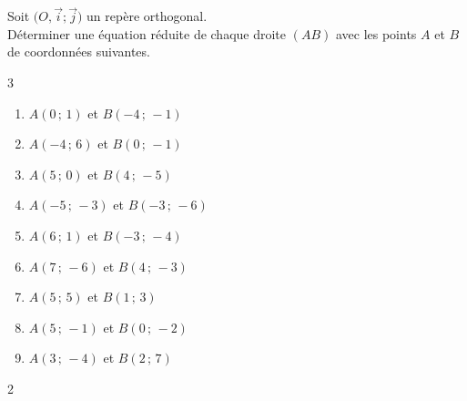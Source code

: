 {%
\begin{Exercice}
Soit $\big(O,\vec i;\vec j\big)$ un repère orthogonal.\\Déterminer une équation réduite de chaque droite $(AB)$ avec les points $A$ et $B$ de coordonnées suivantes.
\begin{multicols}{3}
\begin{enumerate}[itemsep=1em]
	\item \begin{minipage}[t]{\linewidth} $A(0\,;\,1)$ et $B(-4\,;\,-1)$ \end{minipage}
	\item \begin{minipage}[t]{\linewidth} $A(-4\,;\,6)$ et $B(0\,;\,-1)$ \end{minipage}
	\item \begin{minipage}[t]{\linewidth} $A(5\,;\,0)$ et $B(4\,;\,-5)$ \end{minipage}
	\item \begin{minipage}[t]{\linewidth} $A(-5\,;\,-3)$ et $B(-3\,;\,-6)$ \end{minipage}
	\item \begin{minipage}[t]{\linewidth} $A(6\,;\,1)$ et $B(-3\,;\,-4)$ \end{minipage}
	\item \begin{minipage}[t]{\linewidth} $A(7\,;\,-6)$ et $B(4\,;\,-3)$ \end{minipage}
	\item \begin{minipage}[t]{\linewidth} $A(5\,;\,5)$ et $B(1\,;\,3)$ \end{minipage}
	\item \begin{minipage}[t]{\linewidth} $A(5\,;\,-1)$ et $B(0\,;\,-2)$ \end{minipage}
	\item \begin{minipage}[t]{\linewidth} $A(3\,;\,-4)$ et $B(2\,;\,7)$ \end{minipage}
\end{enumerate}
\end{multicols}
\end{Exercice}

\begin{multicols}{2}


\end{multicols}}
